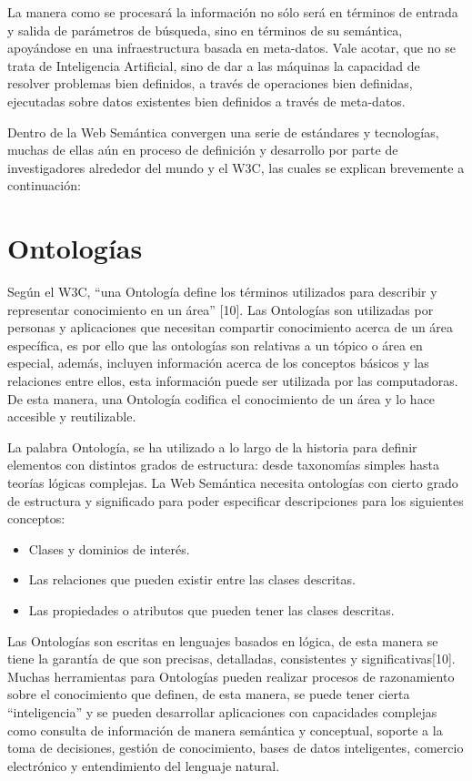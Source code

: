 La manera como se procesará la información no sólo será en términos de entrada y salida de parámetros de búsqueda, sino en términos de su semántica, apoyándose en una infraestructura basada en meta-datos. Vale acotar, que no se trata de Inteligencia Artificial, sino de dar a las máquinas la capacidad de resolver problemas bien definidos, a través de operaciones bien definidas, ejecutadas sobre datos existentes bien definidos a través de meta-datos.

Dentro de la Web Semántica convergen una serie de estándares y tecnologías, muchas de ellas aún en proceso de definición y desarrollo por parte de investigadores alrededor del mundo y el W3C, las cuales se explican brevemente a continuación:

\section{Ontologías}

Según el W3C, ``una Ontología define los términos utilizados para describir y representar conocimiento en un área'' [10]. Las Ontologías son utilizadas por personas y aplicaciones que necesitan compartir conocimiento acerca de un área específica, es por ello que las ontologías son relativas a un tópico o área en especial, además, incluyen información acerca de los conceptos básicos y las relaciones entre ellos, esta información puede ser utilizada por las computadoras. De esta manera, una Ontología codifica el conocimiento de un área y lo hace accesible y reutilizable.

La palabra Ontología, se ha utilizado a lo largo de la historia para definir elementos con distintos grados de estructura: desde taxonomías simples hasta teorías lógicas complejas. La Web Semántica necesita ontologías con cierto grado de estructura y significado para poder especificar descripciones para los siguientes conceptos:

\begin{itemize}
\item Clases y dominios de interés.
\item Las relaciones que pueden existir entre las clases descritas.
\item Las propiedades o atributos que pueden tener las clases descritas.
\end{itemize}

Las Ontologías son escritas en lenguajes basados en lógica, de esta manera se tiene la garantía de que son precisas, detalladas, consistentes y significativas[10]. Muchas herramientas para Ontologías pueden realizar procesos de razonamiento sobre el conocimiento que definen, de esta manera, se puede tener cierta ``inteligencia'' y se pueden desarrollar aplicaciones con capacidades complejas como consulta de información de manera semántica y conceptual, soporte a la toma de decisiones, gestión de conocimiento, bases de datos inteligentes, comercio electrónico y entendimiento del lenguaje natural.

